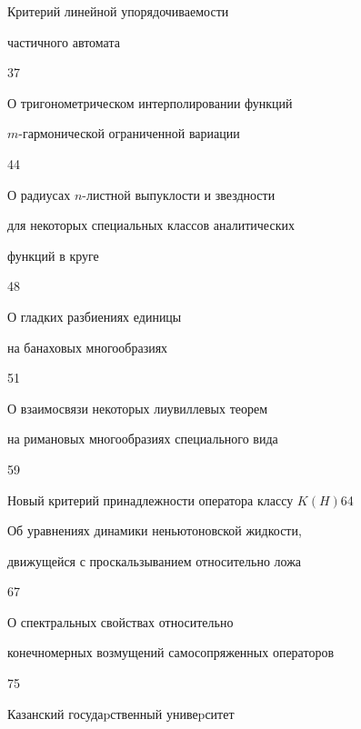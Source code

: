 {Критерий линейной упорядочиваемости 


частичного автомата}{37}




{О тригонометрическом интерполировании функций


$m$-гармонической \newline ограниченной вариации}{44}




{О радиусах $n$-листной выпуклости и звездности 


для \newline некоторых специальных классов аналитических 


функций в круге}{48}




{О гладких разбиениях единицы 


на банаховых многообразиях}{51}




{О взаимосвязи некоторых лиувиллевых теорем 


на римановых многообразиях \newline специального вида}{59}




{Новый критерий принадлежности оператора классу $K(H)$}{64}




{Об уравнениях динамики неньютоновской жидкости, 


движущейся с \newline проскальзыванием относительно ложа}{67}




{О спектральных свойствах относительно 


конечномерных возмущений \newline самосопряженных операторов}{75}



















\vfill


\noindent\raisebox{2pt}{\copyright} Казанский госудаpственный унивеpситет






